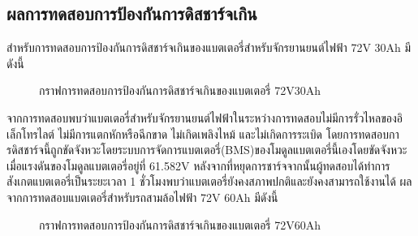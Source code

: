 \subsection{ผลการทดสอบการป้องกันการดิสชาร์จเกิน}
สำหรับการทดสอบการป้องกันการดิสชาร์จเกินของแบตเตอรี่สำหรับจักรยานยนต์ไฟฟ้า 72V 30Ah มีดังนี้
\begin{center}
	\begin{figure}[H]
		\centering
		\captionsetup{justification=centering,margin=2cm}
		\caption{กราฟการทดสอบการป้องกันการดิสชาร์จเกินของแบตเตอรี่ 72V30Ah}
	\end{figure}
\end{center}
จากการทดสอบพบว่าแบตเตอรี่สำหรับจักรยานยนต์ไฟฟ้าในระหว่างการทดสอบไม่มีการรั่วไหลของอิเล็กโทรไลต์ ไม่มีการแตกหักหรือฉีกขาด ไม่เกิดเพลิงไหม้ และไม่เกิดการระเบิด
โดยการทดสอบการดิสชาร์จนี้ถูกขัดจังหวะโดยระบบการจัดการแบตเตอรี่(BMS)ของโมดูลแบตเตอรี่นี้เองโดยขัดจังหวะเมื่อแรงดันของโมดูลแบตเตอรี่อยู่ที่ 61.582V 
หลังจากที่หยุดการชาร์จจากนั้นผู้ทดสอบได้ทำการสังเกตแบตเตอรี่เป็นระยะเวลา 1 ชั่วโมงพบว่าแบตเตอรี่ยังคงสภาพปกติและยังคงสามารถใช้งานได้
\newline\hspace*{2cm}
ผลจากการทดสอบแบตเตอรี่สำหรับรถสามล้อไฟฟ้า 72V 60Ah มีดังนี้
\begin{center}
	\begin{figure}[H]
		\centering
		\captionsetup{justification=centering,margin=2cm}
		\caption{กราฟการทดสอบการป้องกันการดิสชาร์จเกินของแบตเตอรี่ 72V60Ah}
	\end{figure}
\end{center}
